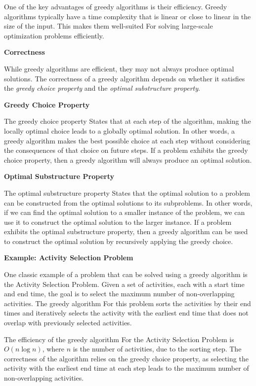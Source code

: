 \documentclass[12pt]{book} %
\begin{document}
One of the key advantages of greedy algorithms is their efficiency. Greedy algorithms typically have a time complexity that is linear or close to linear in the size of the input. This makes them well-suited For solving large-scale optimization problems efficiently.

\textbf{Correctness}

While greedy algorithms are efficient, they may not always produce optimal solutions. The correctness of a greedy algorithm depends on whether it satisfies the \textit{greedy choice property} and the \textit{optimal substructure property}.

\textbf{Greedy Choice Property}

The greedy choice property States that at each step of the algorithm, making the locally optimal choice leads to a globally optimal solution. In other words, a greedy algorithm makes the best possible choice at each step without considering the consequences of that choice on future steps. If a problem exhibits the greedy choice property, then a greedy algorithm will always produce an optimal solution.

\textbf{Optimal Substructure Property}

The optimal substructure property States that the optimal solution to a problem can be constructed from the optimal solutions to its subproblems. In other words, if we can find the optimal solution to a smaller instance of the problem, we can use it to construct the optimal solution to the larger instance. If a problem exhibits the optimal substructure property, then a greedy algorithm can be used to construct the optimal solution by recursively applying the greedy choice.

\textbf{Example: Activity Selection Problem}

One classic example of a problem that can be solved using a greedy algorithm is the Activity Selection Problem. Given a set of activities, each with a start time and end time, the goal is to select the maximum number of non-overlapping activities. The greedy algorithm For this problem sorts the activities by their end times and iteratively selects the activity with the earliest end time that does not overlap with previously selected activities.

The efficiency of the greedy algorithm For the Activity Selection Problem is \(O(n \log n)\), where \(n\) is the number of activities, due to the sorting step. The correctness of the algorithm relies on the greedy choice property, as selecting the activity with the earliest end time at each step leads to the maximum number of non-overlapping activities.
\end{document}
